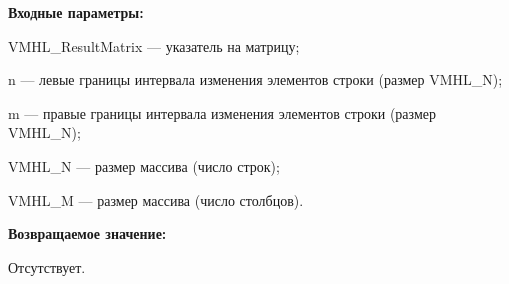 \textbf{Входные параметры:}
 
VMHL\_ResultMatrix --- указатель на матрицу;
 
n --- левые границы интервала изменения элементов строки (размер VMHL\_N);
 
m --- правые границы интервала изменения элементов строки (размер VMHL\_N);
 
VMHL\_N --- размер массива (число строк);
 
VMHL\_M --- размер массива (число столбцов).

\textbf{Возвращаемое значение:}

Отсутствует.